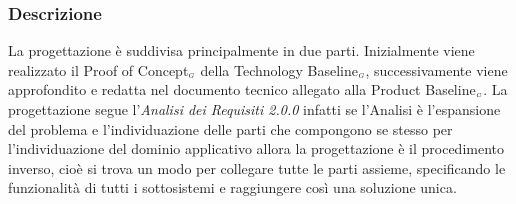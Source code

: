\subsubsection{Descrizione}\label{ProcessiPrimariProgettazioneDescrizione}
La progettazione è suddivisa principalmente in due parti. Inizialmente viene realizzato il Proof of Concept$_{\scaleto{G}{3pt}}$ della Technology Baseline$_{\scaleto{G}{3pt}}$, successivamente viene approfondito e redatta nel documento tecnico allegato alla Product Baseline$_{\scaleto{G}{3pt}}$. La progettazione segue l'\textit{Analisi dei Requisiti 2.0.0} infatti se l'Analisi è l'espansione del problema e l'individuazione delle parti che compongono se stesso per l'individuazione del dominio applicativo allora la progettazione è il procedimento inverso, cioè si trova un modo per collegare tutte le parti assieme, specificando le funzionalità di tutti i sottosistemi e raggiungere così una soluzione unica.
%
